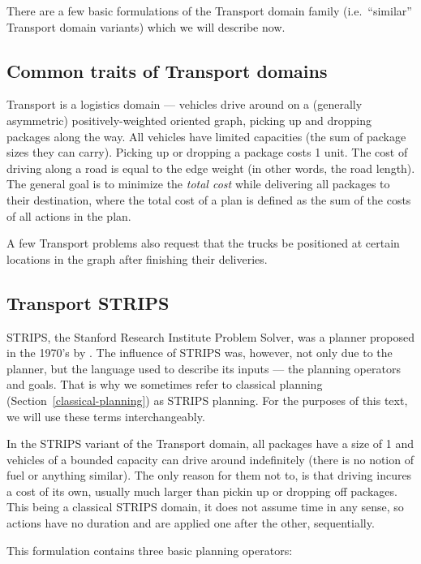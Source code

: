 There are a few basic formulations of the Transport domain family (i.e.~``similar'' Transport domain variants) which we will describe now.

\subsection{Common traits of Transport domains}

Transport is a logistics domain --- vehicles drive around on a (generally asymmetric) positively-weighted oriented graph, picking up and dropping packages along the way.
All vehicles have limited capacities (the sum of package sizes they can carry).
Picking up or dropping a package costs 1 unit. The cost of driving along a road is equal to the edge weight
(in other words, the road length).
The general goal is to minimize the \textit{total cost}
while delivering all packages to their destination, where
the total cost of a plan is defined as the sum of the costs of all actions in
the plan.

A few Transport problems also request that the trucks be positioned at certain
locations in the graph
after finishing their deliveries.

\subsection{Transport STRIPS}\label{transport-strips}

STRIPS, the Stanford Research Institute Problem Solver,
was a planner proposed in the 1970's by \citet{Fikes1971}.
The influence of STRIPS was, however, not only due to the planner,
but the language used to describe its inputs --- the planning operators and goals.
That is why we sometimes refer to classical planning (Section~\ref{classical-planning})
as STRIPS planning. For the purposes of this text, we will use these terms interchangeably.

In the STRIPS variant of the Transport domain,
all packages have a size of 1 and vehicles of a bounded capacity can drive around indefinitely
(there is no notion of fuel or anything similar). The only reason for them not to, is that
driving incures a cost of its own, usually much larger than pickin up or dropping off packages.
This being a classical STRIPS domain,
it does not assume time in any sense,
so actions have no duration and are applied one after the other, sequentially.

This formulation contains three basic planning operators:

